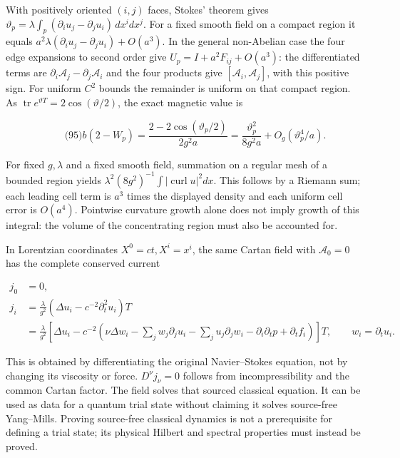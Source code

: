 With positively oriented \((i,j)\) faces, Stokes' theorem gives
\(\vartheta_p=\lambda\int_p(\partial_i u_j-\partial_j u_i)\,dx^i dx^j\).
For a fixed smooth field on a compact region it equals
\(a^2\lambda(\partial_i u_j-\partial_j u_i)+O(a^3)\). In the general
non-Abelian case the four edge expansions to second order give
\(U_p=I+a^2F_{ij}+O(a^3)\): the differentiated terms are
\(\partial_i\mathcal A_j-\partial_j\mathcal A_i\) and the four products
give \([\mathcal A_i,\mathcal A_j]\), with this positive sign. For
uniform \(C^2\) bounds the remainder is uniform on that compact region.
As \(\operatorname{tr}e^{\vartheta T}=2\cos(\vartheta/2)\), the exact
magnetic value is

\[
\qquad\text{(95)}
 b(2-W_p)=\frac{2-2\cos(\vartheta_p/2)}{2g^2a}
       =\frac{\vartheta_p^2}{8g^2a}
          +O_g(\vartheta_p^4/a).
\]

For fixed \(g,\lambda\) and a fixed smooth field, summation on a regular
mesh of a bounded region yields
\(\lambda^2(8g^2)^{-1}\int|\operatorname{curl}u|^2dx\). This follows by
a Riemann sum; each leading cell term is \(a^3\) times the displayed
density and each uniform cell error is \(O(a^4)\). Pointwise curvature
growth alone does not imply growth of this integral: the volume of the
concentrating region must also be accounted for.

In Lorentzian coordinates \(X^0=ct,X^i=x^i\), the same Cartan field with
\(\mathcal A_0=0\) has the complete conserved current

\[
\begin{aligned}
 j_0&=0,\\
 j_i&=\frac{\lambda}{g^2}
       (\Delta u_i-c^{-2}\partial_t^2u_i)T\\
 &=\frac{\lambda}{g^2}\left[
 \Delta u_i-c^{-2}\left(\nu\Delta w_i
 -\sum_jw_j\partial_ju_i-\sum_ju_j\partial_jw_i
 -\partial_i\partial_tp+\partial_tf_i\right)\right]T,\qquad w_i=\partial_tu_i.
\end{aligned}
\]

This is obtained by differentiating the original Navier--Stokes
equation, not by changing its viscosity or force. \(D^\nu j_\nu=0\)
follows from incompressibility and the common Cartan factor. The field
solves that sourced classical equation. It can be used as data for a
quantum trial state without claiming it solves source-free Yang--Mills.
Proving source-free classical dynamics is not a prerequisite for
defining a trial state; its physical Hilbert and spectral properties
must instead be proved.

